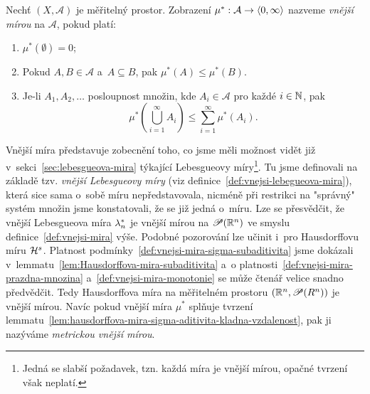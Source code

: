 \begin{definition}\label{def:vnejsi-mira}
    Nechť $(X,\mathcal{A})$ je měřitelný prostor. Zobrazení $\mu^*:\mathcal{A} \rightarrow \langle0,\infty\rangle$ nazveme \emph{vnější mírou} na $\mathcal{A}$, pokud platí:
    \begin{enumerate}[label=(\alph*)]
        \item\label{def:vnejsi-mira-prazdna-mnozina} $\mu^*(\emptyset)=0$;
        \item\label{def:vnejsi-mira-monotonie} Pokud $A,B\in\mathcal{A}$ a~$A\subseteq B$, pak $\mu^*(A)\leqslant\mu^*(B)$.
        \item\label{def:vnejsi-mira-sigma-subaditivita} Je-li $A_1,A_2,\ldots$ posloupnost množin, kde $A_i\in\mathcal{A}$ pro každé $i\in\mathbb{N}$, pak
        \[\mu^*\left(\bigcup_{i=1}^\infty A_i\right)\leqslant\sum_{i=1}^{\infty}\mu^*(A_i).\]
    \end{enumerate}
\end{definition}

Vnější míra představuje zobecnění toho, co jsme měli možnost vidět již v~sekci~\ref{sec:lebesgueova-mira} týkající Lebesgueovy míry\footnote{Jedná se slabší požadavek, tzn. každá míra je vnější mírou, opačné tvrzení však neplatí.}. Tu jsme definovali na základě tzv. \emph{vnější Lebesgueovy míry} (viz definice~\ref{def:vnejsi-lebegueova-mira}), která sice sama o~sobě míru nepředstavovala, nicméně při restrikci na "správný" systém množin jsme konstatovali, že se již jedná o~míru. Lze se přesvědčit, že vnější Lebesgueova míra $\lambda_n^*$ je vnější mírou na $\mathscr{P}(\mathbb{R}^n)$ ve smyslu definice~\ref{def:vnejsi-mira} výše. Podobné pozorování lze učinit i~pro Hausdorffovu míru $\mathcal{H}^{s}$. Platnost podmínky~\ref{def:vnejsi-mira-sigma-subaditivita} jsme dokázali v~lemmatu~\ref{lem:Hausdorffova-mira-subaditivita} a~o platnosti~\ref{def:vnejsi-mira-prazdna-mnozina} a~\ref{def:vnejsi-mira-monotonie} se může čtenář velice snadno předvědčit. Tedy Hausdorffova míra na měřitelném prostoru $(\mathbb{R}^n,\mathscr{P}(R^n))$ je vnější mírou. Navíc pokud vnější míra $\mu^*$ splňuje tvrzení lemmatu~\ref{lem:hausdorffova-mira-sigma-aditivita-kladna-vzdalenost}, pak ji nazýváme \emph{metrickou vnější mírou}.

